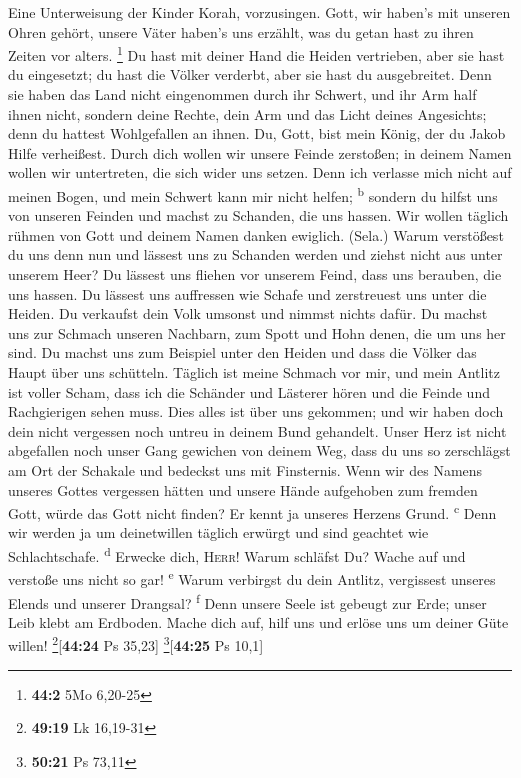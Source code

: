  Eine Unterweisung der Kinder Korah, vorzusingen.
 Gott, wir haben's mit unseren Ohren gehört, unsere Väter
haben's uns erzählt, was du getan hast zu ihren Zeiten vor alters.
\footnote{\textbf{44:2} 5Mo 6,20-25}  Du hast mit deiner
Hand die Heiden vertrieben, aber sie hast du eingesetzt; du hast die
Völker verderbt, aber sie hast du ausgebreitet.  Denn sie
haben das Land nicht eingenommen durch ihr Schwert, und ihr Arm half
ihnen nicht, sondern deine Rechte, dein Arm und das Licht deines
Angesichts; denn du hattest Wohlgefallen an ihnen.  Du,
Gott, bist mein König, der du Jakob Hilfe verheißest. 
Durch dich wollen wir unsere Feinde zerstoßen; in deinem Namen wollen
wir untertreten, die sich wider uns setzen.  Denn ich
verlasse mich nicht auf meinen Bogen, und mein Schwert kann mir nicht
helfen; \textsuperscript{b}  sondern du hilfst uns von
unseren Feinden und machst zu Schanden, die uns hassen. 
Wir wollen täglich rühmen von Gott und deinem Namen danken ewiglich.
(Sela.)  Warum verstößest du uns denn nun und lässest uns
zu Schanden werden und ziehst nicht aus unter unserem Heer?
 Du lässest uns fliehen vor unserem Feind, dass uns
berauben, die uns hassen.  Du lässest uns auffressen wie
Schafe und zerstreuest uns unter die Heiden.  Du
verkaufst dein Volk umsonst und nimmst nichts dafür.  Du
machst uns zur Schmach unseren Nachbarn, zum Spott und Hohn denen, die
um uns her sind.  Du machst uns zum Beispiel unter den
Heiden und dass die Völker das Haupt über uns schütteln. 
Täglich ist meine Schmach vor mir, und mein Antlitz ist voller Scham,
 dass ich die Schänder und Lästerer hören und die Feinde
und Rachgierigen sehen muss.  Dies alles ist über uns
gekommen; und wir haben doch dein nicht vergessen noch untreu in deinem
Bund gehandelt.  Unser Herz ist nicht abgefallen noch
unser Gang gewichen von deinem Weg,  dass du uns so
zerschlägst am Ort der Schakale und bedeckst uns mit Finsternis.
 Wenn wir des Namens unseres Gottes vergessen hätten und
unsere Hände aufgehoben zum fremden Gott,  würde das Gott
nicht finden? Er kennt ja unseres Herzens Grund. \textsuperscript{c}
 Denn wir werden ja um deinetwillen täglich erwürgt und
sind geachtet wie Schlachtschafe. \textsuperscript{d} 
Erwecke dich, \textsc{Herr}! Warum schläfst Du? Wache auf und verstoße
uns nicht so gar! \textsuperscript{e}  Warum verbirgst du
dein Antlitz, vergissest unseres Elends und unserer Drangsal?
\textsuperscript{f}  Denn unsere Seele ist gebeugt zur
Erde; unser Leib klebt am Erdboden.  Mache dich auf, hilf
uns und erlöse uns um deiner Güte willen! \footnote{\textbf{49:19} Lk
  16,19-31}{[}\textbf{44:24} Ps 35,23{]} \footnote{\textbf{50:21} Ps
  73,11}{[}\textbf{44:25} Ps 10,1{]}

